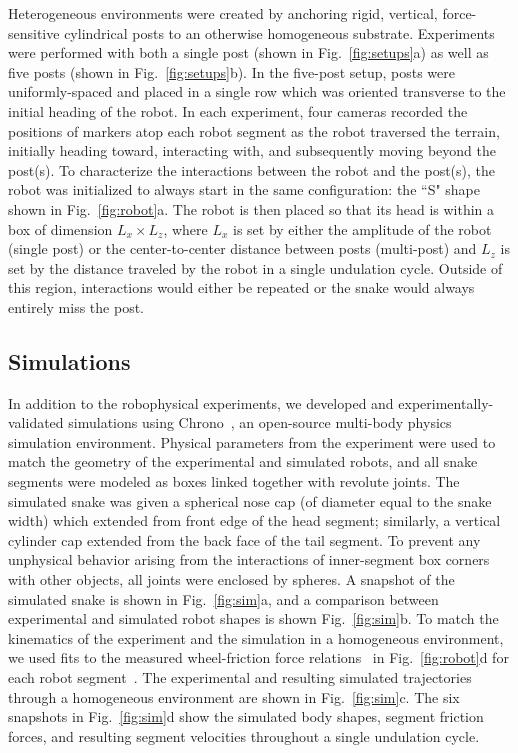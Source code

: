 \documentclass[aps,pre,twocolumn,superscriptaddress]{revtex4-1}
\begin{document}
Heterogeneous environments were created by anchoring rigid, vertical, force-sensitive cylindrical posts to an otherwise homogeneous substrate. Experiments were performed with both a single post (shown in Fig.~\ref{fig:setups}a) as well as five posts (shown in Fig.~\ref{fig:setups}b). In the five-post setup, posts were uniformly-spaced and placed in a single row which was oriented transverse to the initial heading of the robot. In each experiment, four cameras recorded the positions of markers atop each robot segment as the robot traversed the terrain, initially heading toward, interacting with, and subsequently moving beyond the post(s). To characterize the interactions between the robot and the post(s), the robot was initialized to always start in the same configuration: the ``S" shape shown in Fig.~\ref{fig:robot}a. The robot is then placed so that its head is within a box of dimension $L_x \times L_z$, where $L_x$ is set by either the amplitude of the robot (single post) or the center-to-center distance between posts (multi-post) and $L_z$ is set by the distance traveled by the robot in a single undulation cycle. Outside of this region, interactions would either be repeated or the snake would always entirely miss the post.


\subsection{Simulations}

In addition to the robophysical experiments, we developed and experimentally-validated simulations using Chrono~\cite{Chrono2016}, an open-source multi-body physics simulation environment. Physical parameters from the experiment were used to match the geometry of the experimental and simulated robots, and all snake segments were modeled as boxes linked together with revolute joints. The simulated snake was given a spherical nose cap (of diameter equal to the snake width) which extended from front edge of the head segment; similarly, a vertical cylinder cap extended from the back face of the tail segment. To prevent any unphysical behavior arising from the interactions of inner-segment box corners with other objects, all joints were enclosed by spheres. A snapshot of the simulated snake is shown in Fig.~\ref{fig:sim}a, and a comparison between experimental and simulated robot shapes is shown Fig.~\ref{fig:sim}b. To match the kinematics of the experiment and the simulation in a homogeneous environment, we used fits to the measured wheel-friction force relations~\cite{supplemental} in Fig.~\ref{fig:robot}d for each robot segment~\cite{wheelnote}. The experimental and resulting simulated trajectories through a homogeneous environment are shown in Fig.~\ref{fig:sim}c. The six snapshots in Fig.~\ref{fig:sim}d show the simulated body shapes, segment friction forces, and resulting segment velocities throughout a single undulation cycle.
\end{document}
